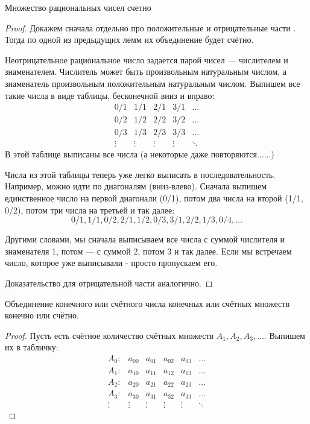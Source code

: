 \begin{lemma} \thmslashn

	Множество рациональных чисел \Q счетно
	\begin{proof} \thmslashn
	
		Докажем сначала отдельно про положительные и отрицательные части \Q. Тогда по одной из предыдущих лемм их объединение будет счётно.
		
		Неотрицательное рациональное число задается парой чисел — числителем и знаменателем. Числитель может быть произвольным натуральным числом, а знаменатель произвольным положительным натуральным числом. Выпишем все такие числа в виде таблицы, бесконечной вниз и вправо:
		\begin{equation*}
			\begin{matrix}
				0/1 & 1/1 & 2/1 & 3/1 & \ldots \\
				0/2 & 1/2 & 2/2 & 3/2 & \ldots \\
				0/3 & 1/3 & 2/3 & 3/3 & \ldots \\
				\vdots & \vdots & \vdots & \vdots & \ddots 
			\end{matrix}
		\end{equation*}
		В этой таблице выписаны все числа (а некоторые даже повторяются......)
		
		Числа из этой таблицы теперь уже легко выписать в последовательность. Например, можно идти по диагоналям (вниз-влево). Сначала выпишем единственное число на первой диагонали (0/1), потом два числа на второй (1/1, 0/2), потом три числа на третьей и так далее:
		\[0/1, 1/1, 0/2, 2/1, 1/2, 0/3, 3/1, 2/2, 1/3, 0/4, \ldots \]
		
		Другими словами, мы сначала выписываем все числа с суммой числителя и знаменателя 1, потом — с суммой 2, потом 3 и так далее. Если мы встречаем число, которое уже выписывали - просто пропускаем его. 
		
		Доказательство для отрицательной части \Q аналогично.
	\end{proof}
\end{lemma}

\begin{theorem} \thmslashn

	Объединение конечного или счётного числа конечных или счётных множеств конечно или счётно.
	\begin{proof} \thmslashn
	
		Пусть есть счётное количество счётных множеств $A_1, A_2, A_3, \ldots$. Выпишем их в табличку:
		\begin{equation*}
			\begin{matrix}
				A_0: & a_{00} & a_{01} & a_{02} & a_{03} & \ldots \\
				A_1: & a_{10} & a_{11} & a_{12} & a_{13} & \ldots \\
				A_2: & a_{20} & a_{21} & a_{22} & a_{23} & \ldots \\
				A_3: & a_{30} & a_{31} & a_{32} & a_{33} & \ldots \\
				\vdots & \vdots & \vdots & \vdots & \vdots & \ddots 
			\end{matrix}
		\end{equation*}
	\end{proof}
\end{theorem}

